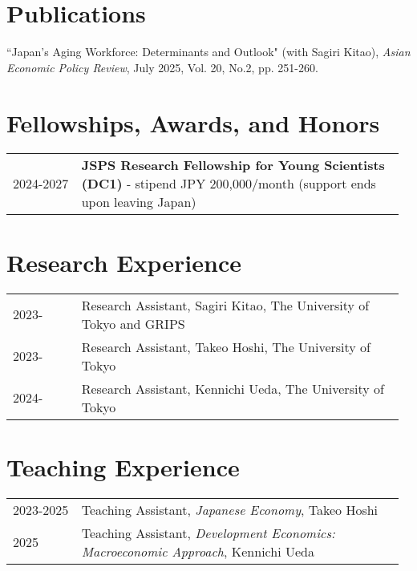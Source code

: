 \documentclass[11pt]{article}
\begin{document}
\section*{Publications}
\begin{enumerate}[label={[\arabic*]}, leftmargin=*]
    \item “Japan's Aging Workforce: Determinants and Outlook" (with Sagiri Kitao), \textit{Asian Economic Policy Review}, July 2025, Vol. 20, No.2, pp. 251-260.
\end{enumerate}

\section*{Fellowships, Awards, and Honors}
\begin{tabular}{p{0.17\linewidth} p{0.80\linewidth}}
2024-2027 & \textbf{JSPS Research Fellowship for Young Scientists (DC1)} - stipend JPY 200,000/month (support ends upon leaving Japan)\\
\end{tabular}

\section*{Research Experience}
\begin{tabular}{p{0.17\linewidth} p{0.80\linewidth}}
2023- & Research Assistant, Sagiri Kitao, The University of Tokyo and GRIPS\\[2pt]
2023- & Research Assistant, Takeo Hoshi, The University of Tokyo\\[2pt]
2024- & Research Assistant, Kennichi Ueda, The University of Tokyo\\[2pt]
\end{tabular}

\section*{Teaching Experience}
\begin{tabular}{p{0.17\linewidth} p{0.80\linewidth}}
2023-2025 & Teaching Assistant, \textit{Japanese Economy}, Takeo Hoshi\\[2pt]
2025      & Teaching Assistant, \textit{Development Economics: Macroeconomic Approach}, Kennichi Ueda\\[2pt]
\end{tabular}
\end{document}
